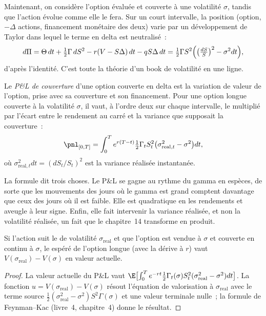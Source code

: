 Maintenant, on considère l'option évaluée et couverte à une volatilité $\sigma$, tandis que l'action
évolue comme elle le fera. Sur un court intervalle, la position (option, $-\Delta$ actions,
financement monétaire des deux) varie par un développement de Taylor dans lequel le terme en delta est
neutralisé~:
\[
d\Pi=\Theta\,dt+\tfrac12\Gamma\,dS^2-r(V-S\Delta)\,dt-qS\Delta\,dt
=\tfrac12\Gamma S^2\Bigl(\bigl(\tfrac{dS}{S}\bigr)^2-\sigma^2dt\Bigr),
\]
d'après l'identité. C'est toute la théorie d'un book de volatilité en une ligne.

\begin{definition}[P\&L de couverture]\label{def:dv:greeks-and-the-hedging-pnl:hpnl}
Le \emph{P\&L de couverture} d'une option couverte en delta est la variation
de valeur de l'option, prise avec sa couverture et son financement. Pour une option longue
couverte à la volatilité $\sigma$, il vaut, à l'ordre deux sur chaque intervalle,
le  multiplié par l'écart entre le rendement au carré et la variance
que supposait la couverture~:
\[
\pnl_{[0,T]}=\int_0^Te^{r(T-t)}\tfrac12\Gamma_tS_t^2\bigl(\sigma_{\mathrm{real},t}^2-\sigma^2\bigr)dt ,
\]
où $\sigma^2_{\mathrm{real},t}dt=(dS_t/S_t)^2$ est la
variance réalisée instantanée.
\end{definition}

La formule dit trois choses. Le P\&L se gagne au rythme du gamma en espèces, de sorte
que les mouvements des jours où le gamma est grand comptent davantage que ceux des jours
où il est faible. Elle est quadratique en les rendements et aveugle à leur signe. Enfin,
elle fait intervenir la variance réalisée, et non la volatilité réalisée, un fait que le
chapitre~14 transforme en produit.

\begin{proposition}\label{prop:dv:greeks-and-the-hedging-pnl:expected}
Si l'action suit le  de volatilité $\sigma_{\mathrm{real}}$
et que l'option est vendue à $\sigma$ et couverte en continu à $\sigma$, le 
espéré de l'option longue (avec la dérive à $r$) vaut
$V(\sigma_{\mathrm{real}})-V(\sigma)$ en valeur actuelle.
\end{proposition}
\begin{proof}
La valeur actuelle du P\&L vaut $\E\bigl[\int_0^Te^{-rt}\tfrac12\Gamma_t(\sigma)S_t^2
(\sigma_{\mathrm{real}}^2-\sigma^2)dt\bigr]$. La fonction $u=V(\sigma_{\mathrm{real}})-
V(\sigma)$ résout l'équation de valorisation à $\sigma_{\mathrm{real}}$ avec le
terme source $\tfrac12(\sigma_{\mathrm{real}}^2-\sigma^2)S^2\Gamma(\sigma)$ et une valeur terminale nulle~;
la formule de Feynman--Kac (livre~4, chapitre~4) donne le résultat.
\end{proof}

